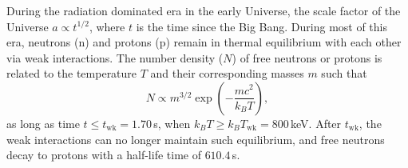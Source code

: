 During the radiation dominated era in the early Universe, the scale factor of
the Universe $a \propto t^{1/2}$, where $t$ is the time since the Big Bang.
During most of this era, neutrons (n) and protons (p) remain in thermal
equilibrium with each other via weak interactions. The number density ($N$) of
free neutrons or protons is related to the temperature $T$ and their
corresponding masses $m$ such that
\[ N \propto m^{3/2}\exp\left(-\frac{mc^2}{k_B T}\right), \]
as long as time $t \leq t_{\mathrm{wk}} = 1.70$\,s, when
$k_B T \geq k_B T_{\mathrm{wk}} = 800$\,keV. After $t_{\mathrm{wk}}$, the weak
interactions can no longer maintain such equilibrium, and free neutrons decay
to protons with a half-life time of $610.4$\,s.

